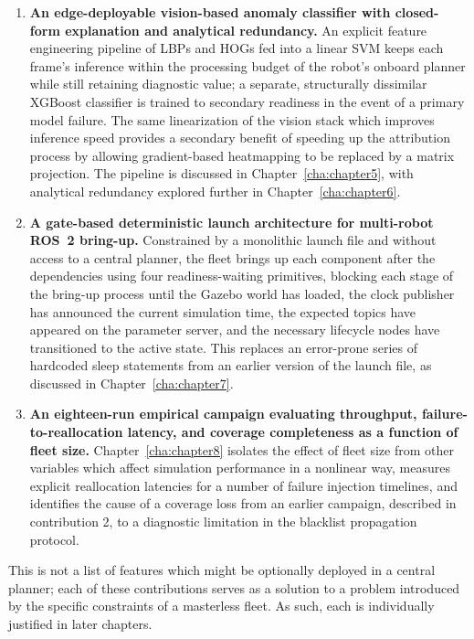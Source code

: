 \begin{enumerate}
    \item \textbf{An edge-deployable vision-based anomaly classifier with closed-form explanation and analytical redundancy.} An explicit feature engineering pipeline of LBPs and HOGs fed into a linear SVM keeps each frame's inference within the processing budget of the robot's onboard planner while still retaining diagnostic value; a separate, structurally dissimilar XGBoost classifier is trained to secondary readiness in the event of a primary model failure. The same linearization of the vision stack which improves inference speed provides a secondary benefit of speeding up the attribution process by allowing gradient-based heatmapping to be replaced by a matrix projection. The pipeline is discussed in Chapter~\ref{cha:chapter5}, with analytical redundancy explored further in Chapter~\ref{cha:chapter6}.

    \item \textbf{A gate-based deterministic launch architecture for multi-robot ROS~2 bring-up.} Constrained by a monolithic launch file and without access to a central planner, the fleet brings up each component after the dependencies using four readiness-waiting primitives, blocking each stage of the bring-up process until the Gazebo world has loaded, the clock publisher has announced the current simulation time, the expected topics have appeared on the parameter server, and the necessary lifecycle nodes have transitioned to the active state. This replaces an error-prone series of hardcoded sleep statements from an earlier version of the launch file, as discussed in Chapter~\ref{cha:chapter7}.

    \item \textbf{An eighteen-run empirical campaign evaluating throughput, failure-to-reallocation latency, and coverage completeness as a function of fleet size.} Chapter~\ref{cha:chapter8} isolates the effect of fleet size from other variables which affect simulation performance in a nonlinear way, measures explicit reallocation latencies for a number of failure injection timelines, and identifies the cause of a coverage loss from an earlier campaign, described in contribution 2, to a diagnostic limitation in the blacklist propagation protocol.
\end{enumerate}

This is not a list of features which might be optionally deployed in a central planner; each of these contributions serves as a solution to a problem introduced by the specific constraints of a masterless fleet. As such, each is individually justified in later chapters.

